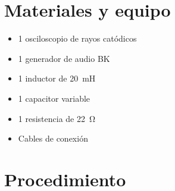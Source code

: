 \documentclass{report}
\newcommand{\mat}{Materiales y equipo}
\newcommand{\pro}{Procedimiento}
\begin{document}
\section{\mat}
\begin{itemize}
\item 1 osciloscopio de rayos catódicos
\item 1 generador de audio BK
\item 1 inductor de \SI{20}{\milli\henry}
\item 1 capacitor variable
\item 1 resistencia de \SI{22}{\ohm}
\item Cables de conexión
\end{itemize}
\section{\pro}
\end{document}
